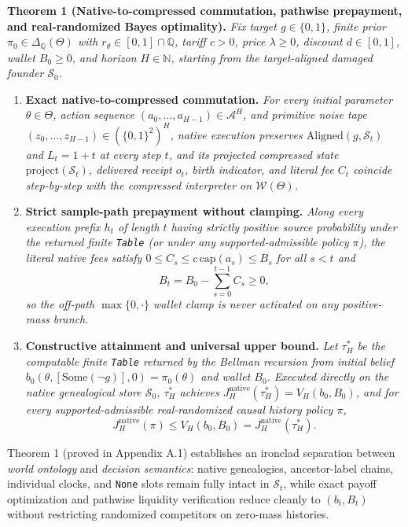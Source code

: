 \documentclass[11pt,letterpaper]{article}
\providecommand{\tightlist}{\setlength{\itemsep}{2pt}\setlength{\parskip}{0pt}}
\begin{document}
\textbf{Theorem 1 (Native-to-compressed commutation, pathwise
prepayment, and real-randomized Bayes optimality).} \emph{Fix target
\(g \in \{0,1\}\), finite prior
\(\pi_0 \in \Delta_{\mathbb{Q}}(\Theta)\) with
\(r_\theta \in [0,1] \cap \mathbb{Q}\), tariff \(c > 0\), price
\(\lambda \ge 0\), discount \(d \in [0,1]\), wallet \(B_0 \ge 0\), and
horizon \(H \in \mathbb{N}\), starting from the target-aligned damaged
founder \(\mathcal{S}_0\).}

\begin{enumerate}
\def\labelenumi{\arabic{enumi}.}
\tightlist
\item
  \textbf{Exact native-to-compressed commutation.} \emph{For every
  initial parameter \(\theta \in \Theta\), action sequence
  \((a_0, \dots, a_{H-1}) \in \mathcal{A}^H\), and primitive noise tape
  \((z_0, \dots, z_{H-1}) \in (\{0,1\}^2)^H\), native execution
  preserves \(\mathrm{Aligned}(g, \mathcal{S}_t)\) and \(L_t = 1 + t\)
  at every step \(t\), and its projected compressed state
  \(\mathrm{project}(\mathcal{S}_t)\), delivered receipt \(o_t\), birth
  indicator, and literal fee \(C_t\) coincide step-by-step with the
  compressed interpreter on \(\mathcal{W}(\Theta)\).}
\item
  \textbf{Strict sample-path prepayment without clamping.} \emph{Along
  every execution prefix \(h_t\) of length \(t\) having strictly
  positive source probability under the returned finite \texttt{Table}
  (or under any supported-admissible policy \(\pi\)), the literal native
  fees satisfy \(0 \le C_s \le c\,\mathrm{cap}(a_s) \le B_s\) for all
  \(s < t\) and} \[B_t = B_0 - \sum_{s=0}^{t-1} C_s \ge 0,\] \emph{so
  the off-path \(\max\{0, \cdot\}\) wallet clamp is never activated on
  any positive-mass branch.}
\item
  \textbf{Constructive attainment and universal upper bound.} \emph{Let
  \(\tau_H^*\) be the computable finite \texttt{Table} returned by the
  Bellman recursion from initial belief
  \(b_0(\theta, [\mathrm{Some}(\neg g)], 0) = \pi_0(\theta)\) and wallet
  \(B_0\). Executed directly on the native genealogical store
  \(\mathcal{S}_0\), \(\tau_H^*\) achieves
  \(J_H^{\mathrm{native}}(\tau_H^*) = V_H(b_0, B_0)\), and for every
  supported-admissible real-randomized causal history policy \(\pi\),}
  \[J_H^{\mathrm{native}}(\pi) \le V_H(b_0, B_0) = J_H^{\mathrm{native}}(\tau_H^*).\]
\end{enumerate}

Theorem 1 (proved in Appendix A.1) establishes an ironclad separation
between \emph{world ontology} and \emph{decision semantics}: native
genealogies, ancestor-label chains, individual clocks, and \texttt{None}
slots remain fully intact in \(\mathcal{S}_t\), while exact payoff
optimization and pathwise liquidity verification reduce cleanly to
\((b_t, B_t)\) without restricting randomized competitors on zero-mass
histories.
\end{document}
